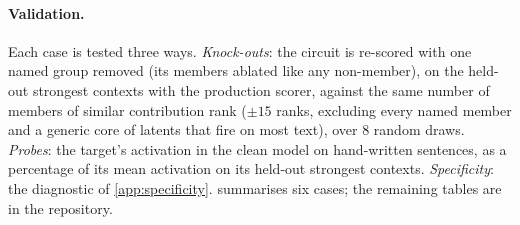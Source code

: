 \documentclass[10pt]{article}
\begin{document}
\paragraph{Validation.}
Each case is tested three ways.
\emph{Knock-outs}: the circuit is re-scored with one named group removed (its members ablated like any non-member), on the held-out strongest contexts with the production scorer, against the same number of members of similar contribution rank ($\pm 15$ ranks, excluding every named member and a generic core of latents that fire on most text), over $8$ random draws.
\emph{Probes}: the target's activation in the clean model on hand-written sentences, as a percentage of its mean activation on its held-out strongest contexts.
\emph{Specificity}: the diagnostic of \cref{app:specificity}.
 summarises six cases; the remaining tables are in the repository.
\end{document}
